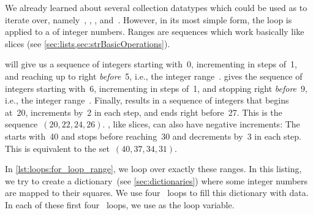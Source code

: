 We already learned about several collection datatypes which could be used as  to iterate over, namely~, , , and~.
However, in its most simple form, the  loop is applied to a  of integer numbers.
Ranges are sequences which work basically like slices (see \cref{sec:lists,sec:strBasicOperations}).

 will give us a sequence of integers starting with~0, incrementing in steps of~1, and reaching up to right \emph{before}~5, i.e., the integer range~.
 gives the sequence of integers starting with~6, incrementing in steps of~1, and stopping right \emph{before}~9, i.e., the integer range~.
Finally,  results in a sequence of integers that begins at~20, increments by~2 in each step, and ends right before~27.
This is the sequence~$(20, 22, 24, 26)$.
, like slices, can also have negative increments:
The  starts with~40 and stops before reaching~30 and decrements by~3 in each step.
This is equivalent to the set~$(40, 37, 34, 31)$.

In \cref{lst:loops:for_loop_range}, we loop over exactly these ranges.
In this listing, we try to create a dictionary~(see \cref{sec:dictionaries}) where some integer numbers are mapped to their squares.
We use four ~loops to fill this dictionary with data.
In each of these first four ~loops, we use  as the loop variable.


